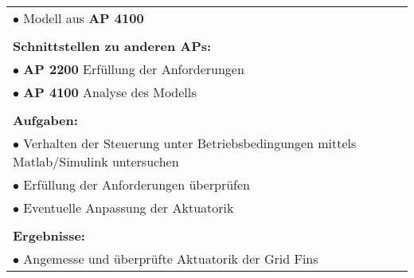 \begin{table}[!h]
\begin{center}
\begin{tabular}{|p{35mm}||p{55mm}|p{50mm}||p{40mm}|}
			\multicolumn{4}{|p{150mm}|}{$\bullet$ Modell aus \textbf{AP 4100}}\\
			\multicolumn{4}{|p{150mm}|}{}\\
			\multicolumn{4}{|p{150mm}|}{\textbf{Schnittstellen zu anderen APs:}}\\
			\multicolumn{4}{|p{150mm}|}{$\bullet$ \textbf{AP 2200} Erfüllung der Anforderungen}\\
			\multicolumn{4}{|p{150mm}|}{$\bullet$ \textbf{AP 4100} Analyse des Modells}\\
			\multicolumn{4}{|p{150mm}|}{}\\
			\multicolumn{4}{|p{150mm}|}{\textbf{Aufgaben:}}\\
			\multicolumn{4}{|p{150mm}|}{$\bullet$ Verhalten der Steuerung unter Betriebsbedingungen mittels Matlab/Simulink untersuchen}\\
			\multicolumn{4}{|p{150mm}|}{$\bullet$ Erfüllung der Anforderungen überprüfen}\\
			\multicolumn{4}{|p{150mm}|}{$\bullet$ Eventuelle Anpassung der Aktuatorik}\\
			\multicolumn{4}{|p{150mm}|}{}\\
			\multicolumn{4}{|p{150mm}|}{\textbf{Ergebnisse:}}\\
			\multicolumn{4}{|p{150mm}|}{$\bullet$ Angemesse und überprüfte Aktuatorik der Grid Fins}\\
			\hline
		\end{tabular}
	\end{center}
\end{table}

